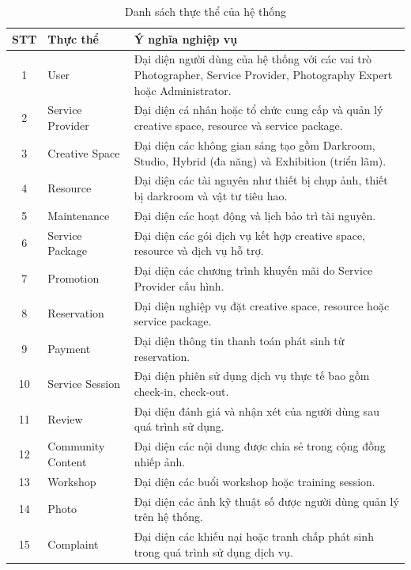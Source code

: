 \begin{table}[htbp]
\centering
\begin{tabular}{|c|l|p{8cm}|}
\hline
\textbf{STT} & \textbf{Thực thể} & \textbf{Ý nghĩa nghiệp vụ} \\
\hline
1 & User & Đại diện người dùng của hệ thống với các vai trò Photographer, Service Provider, Photography Expert hoặc Administrator. \\
\hline
2 & Service Provider & Đại diện cá nhân hoặc tổ chức cung cấp và quản lý creative space, resource và service package. \\
\hline
3 & Creative Space & Đại diện các không gian sáng tạo gồm Darkroom, Studio, Hybrid (đa năng) và Exhibition (triển lãm). \\
\hline
4 & Resource & Đại diện các tài nguyên như thiết bị chụp ảnh, thiết bị darkroom và vật tư tiêu hao. \\
\hline
5 & Maintenance & Đại diện các hoạt động và lịch bảo trì tài nguyên. \\
\hline
6 & Service Package & Đại diện các gói dịch vụ kết hợp creative space, resource và dịch vụ hỗ trợ. \\
\hline
7 & Promotion & Đại diện các chương trình khuyến mãi do Service Provider cấu hình. \\
\hline
8 & Reservation & Đại diện nghiệp vụ đặt creative space, resource hoặc service package. \\
\hline
9 & Payment & Đại diện thông tin thanh toán phát sinh từ reservation. \\
\hline
10 & Service Session & Đại diện phiên sử dụng dịch vụ thực tế bao gồm check-in, check-out. \\
\hline
11 & Review & Đại diện đánh giá và nhận xét của người dùng sau quá trình sử dụng. \\
\hline
12 & Community Content & Đại diện các nội dung được chia sẻ trong cộng đồng nhiếp ảnh. \\
\hline
13 & Workshop & Đại diện các buổi workshop hoặc training session. \\
\hline
14 & Photo & Đại diện các ảnh kỹ thuật số được người dùng quản lý trên hệ thống. \\
\hline
15 & Complaint & Đại diện các khiếu nại hoặc tranh chấp phát sinh trong quá trình sử dụng dịch vụ. \\
\hline
\end{tabular}
\caption{Danh sách thực thể của hệ thống}
\end{table}

